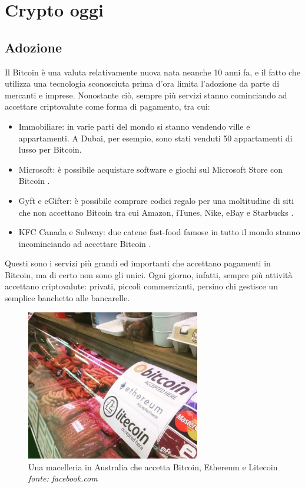\documentclass {article}
\begin{document}
\newpage
\null
\newpage


\section {Crypto oggi}


\subsection {Adozione}


Il Bitcoin è una valuta relativamente nuova nata neanche 10 anni fa, e il fatto che utilizza una tecnologia sconosciuta prima d'ora limita l'adozione da parte di mercanti e imprese.
Nonostante ciò, sempre più servizi stanno cominciando ad accettare criptovalute come forma di pagamento, tra cui:

\begin{itemize}
\item Immobiliare: in varie parti del mondo si stanno vendendo ville e appartamenti. A Dubai, per esempio, sono stati venduti 50 appartamenti di lusso per Bitcoin\cite{dubai}.
\item Microsoft: è possibile acquistare software e giochi sul Microsoft Store con Bitcoin \cite{accepting}.
\item Gyft e eGifter: è possibile comprare codici regalo per una moltitudine di siti che non accettano Bitcoin tra cui Amazon, iTunes, Nike, eBay e Starbucks \cite{accepting}. 
\item KFC Canada e Subway: due catene fast-food famose in tutto il mondo stanno incominciando ad accettare Bitcoin \cite{accepting}. 
\end{itemize}
%
Questi sono i servizi più grandi ed importanti che accettano pagamenti in Bitcoin, ma di certo non sono gli unici.
Ogni giorno, infatti, sempre più attività accettano criptovalute: privati, piccoli commercianti, persino chi gestisce un semplice banchetto alle bancarelle.

\vspace {0.5cm}
\begin{figure}[htb!]
\includegraphics [width = 7.6cm] {butchers.jpg}
\centering
\captionsetup{width=1.4\linewidth}
\caption {Una macelleria in Australia che accetta Bitcoin, Ethereum e Litecoin\\\textit{fonte: facebook.com}}
\end{figure}
\end{document}

